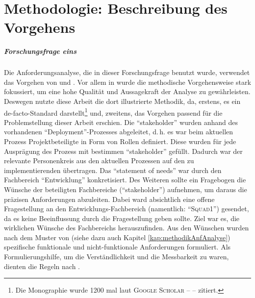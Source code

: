 \chapter{Methodologie: Beschreibung des Vorgehens}

\paragraph{Forschungsfrage eins}
Die Anforderungsanalyse, die in dieser Forschungsfrage benutzt wurde, verwendet das Vorgehen von \cite{hull_requirements_2011} und \cite{partsch_requirements-engineering_2010}. Vor allem in \cite{hull_requirements_2011} wurde die methodische Vorgehensweise stark fokussiert, um eine hohe Qualität und Aussagekraft der Analyse zu gewährleisten. Deswegen nutzte diese Arbeit die dort illustrierte Methodik, da, erstens, es ein de-facto-Standard darstellt\footnote{Die Monographie wurde 1200 mal laut \textsc{Google Scholar} -- \cite{google_llc_google_2020} -- zitiert.} und, zweitens, das Vorgehen passend für die Problemstellung dieser Arbeit erschien. Die \enquote{stakeholder} wurden anhand des vorhandenen \enquote{Deployment}-Prozesses abgeleitet, d.\,h. es war beim aktuellen Prozess Projektbeteiligte in Form von Rollen definiert. Diese wurden für jede Ausprägung des Prozess mit bestimmen \enquote{stakeholder} gefüllt. Dadurch war der relevante Personenkreis aus den aktuellen Prozessen auf den zu implementierenden übertragen. Das \enquote{statement of needs} war durch den Fachbereich \enquote{Entwicklung} konkretisiert. Des Weiteren sollte ein Fragebogen die Wünsche der beteiligten Fachbereiche (\enquote{stakeholder}) aufnehmen, um daraus die präzisen Anforderungen abzuleiten. Dabei ward absichtlich eine offene Fragestellung an den Entwicklungs-Fachbereich (namentlich: \enquote{\textsc{Squad1}}) gesendet, da es keine Beeinflussung durch die Fragestellung geben sollte. Ziel war es, die wirklichen Wünsche des Fachbereichs herauszufinden. Aus den Wünschen wurden nach dem Muster von \cite[vgl.][S.\,28]{hull_requirements_2011} (siehe dazu auch Kapitel \vref{kap:methodikAnfAnalyse}) spezifische funktionale und nicht-funktionale Anforderungen formuliert. Als Formulierungshilfe, um die Verständlichkeit und die Messbarkeit zu waren, dienten die Regeln nach \cite{rupp_formulierungsregel_2020}. 
\par

